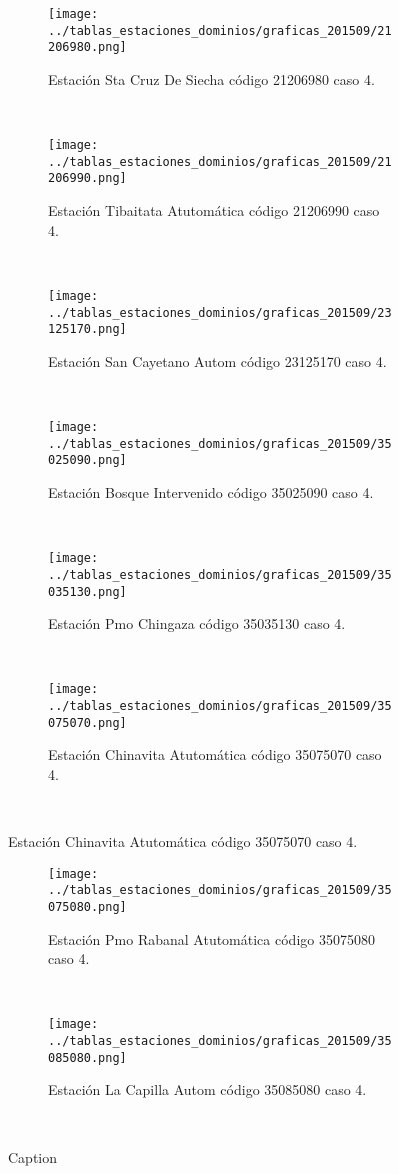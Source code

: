 \begin{figure}[H]
\centering
\begin{subfigure}[normla]{0.4\textwidth}
\texttt{[image: ../tablas\_estaciones\_dominios/graficas\_201509/21206980.png]}
\caption{Estación Sta Cruz De Siecha código 21206980 caso 4.}
\end{subfigure}
~
\begin{subfigure}[normla]{0.4\textwidth}
\texttt{[image: ../tablas\_estaciones\_dominios/graficas\_201509/21206990.png]}
\caption{Estación Tibaitata Atutomática código 21206990 caso 4.}
\end{subfigure}
~
\begin{subfigure}[normla]{0.4\textwidth}
\texttt{[image: ../tablas\_estaciones\_dominios/graficas\_201509/23125170.png]}
\caption{Estación San Cayetano Autom código 23125170 caso 4.}
\end{subfigure}
~
\begin{subfigure}[normla]{0.4\textwidth}
\texttt{[image: ../tablas\_estaciones\_dominios/graficas\_201509/35025090.png]}
\caption{Estación Bosque Intervenido código 35025090 caso 4.}
\end{subfigure}
~
\begin{subfigure}[normla]{0.4\textwidth}
\texttt{[image: ../tablas\_estaciones\_dominios/graficas\_201509/35035130.png]}
\caption{Estación Pmo Chingaza código 35035130 caso 4.}
\end{subfigure}
~
\begin{subfigure}[normla]{0.4\textwidth}
\texttt{[image: ../tablas\_estaciones\_dominios/graficas\_201509/35075070.png]}
\caption{Estación Chinavita Atutomática código 35075070 caso 4.}
\end{subfigure}
~
\end{figure}
 
\begin{figure}[H]\ContinuedFloat
\centering
\begin{subfigure}[normla]{0.4\textwidth}
\texttt{[image: ../tablas\_estaciones\_dominios/graficas\_201509/35075080.png]}
\caption{Estación Pmo Rabanal Atutomática código 35075080 caso 4.}
\end{subfigure}
~
\begin{subfigure}[normla]{0.4\textwidth}
\texttt{[image: ../tablas\_estaciones\_dominios/graficas\_201509/35085080.png]}
\caption{Estación La Capilla Autom código 35085080 caso 4.}
\end{subfigure}
~

 
 \caption{Caption}
 \label{fig:my_label}
\end{figure}
